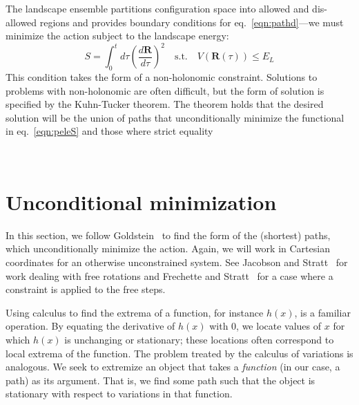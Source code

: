 \documentclass[letterpaper]{tufte-handout}
\newcommand{\laeq}[1]{\label{eqn:#1}}
\renewcommand{\refeq}[1]{eq.~\ref{eqn:#1}}
\renewcommand{\vec}[1]{\mathbf{#1}}
\newcommand{\cvec}[1]{\vec{#1}}
\renewcommand{\refeq}[1]{eq.~\ref{eqn:#1}}
\begin{document}
The landscape ensemble partitions configuration space into allowed and dis-allowed regions and provides boundary conditions for \refeq{pathd}---we must minimize the action subject to the landscape energy:
\begin{equation} \laeq{peleS}
  S = \int_{0}^{t}d\tau {\left(\frac{d\vec{R}}{d\tau} \right)}^{2}  \quad \textrm{s.t.} \quad   V(\cvec{R}(\tau)) \le E_L
\end{equation}
This condition takes the form of a non-holonomic constraint. Solutions to problems with non-holonomic are often difficult, but the form of solution is specified by the Kuhn-Tucker theorem\cite{kuhntucker:1951}. The theorem holds that the desired solution will be the union of paths that unconditionally minimize the functional in \refeq{peleS} and those where strict equality

\FloatBarrier\

\section{Unconditional minimization}
In this section, we follow Goldstein~\cite[-2\baselineskip]{goldstein:1980} to find the form of the (shortest) paths, which unconditionally minimize the action. Again, we will work in Cartesian coordinates for an otherwise unconstrained system. See Jacobson and Stratt~\cite{jacobson:2014} for work dealing with free rotations and Frechette and Stratt~\cite{frechette:2016} for a case where a constraint is applied to the free steps.

Using calculus to find the extrema of a function, for instance $h(x)$, is a familiar operation. By equating the derivative of $h(x)$ with $0$, we locate values of $x$ for which $h(x)$ is unchanging or stationary; these locations often correspond to local extrema of the function. The problem treated by the calculus of variations is analogous. We seek to extremize an object that takes a \emph{function} (in our case, a path) as its argument. That is, we find some path such that the object is stationary with respect to variations in that function.
\end{document}
